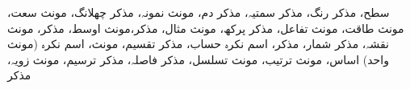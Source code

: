 سطح، مذکر
رنگ، مذکر
سمتیہ، مذکر
دم، مونث
نمونہ، مذکر
چھلانگ، مونث
سعت، مونث
طاقت، مونث
تفاعل، مذکر
پرکھ، مونث
مثال، مذکر،مونث
اوسط، مذکر، مونث
نقشہ، مذکر
شمار، مذکر، اسم نکرہ
حساب، مذکر
تقسیم، مونث، اسم نکرہ (مونث واحد)
اساس، مونث
ترتیب، مونث
تسلسل، مذکر
فاصلہ، مذکر
ترسیم، مونث
زویہ، مذکر
